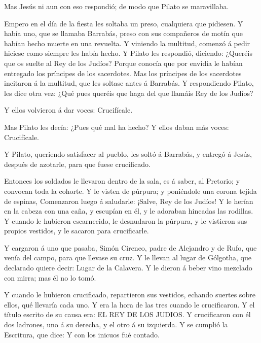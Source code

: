  Mas Jesús ni aun con eso respondió; de modo que Pilato se
maravillaba.

 Empero en el día de la fiesta les soltaba un preso,
cualquiera que pidiesen.  Y había uno, que se llamaba
Barrabás, preso con sus compañeros de motín que habían hecho muerte en
una revuelta.  Y viniendo la multitud, comenzó á pedir
hiciese como siempre les había hecho.  Y Pilato les
respondió, diciendo: ¿Queréis que os suelte al Rey de los Judíos?
 Porque conocía que por envidia le habían entregado los
príncipes de los sacerdotes.  Mas los príncipes de los
sacerdotes incitaron á la multitud, que les soltase antes á Barrabás.
 Y respondiendo Pilato, les dice otra vez: ¿Qué pues
queréis que haga del que llamáis Rey de los Judíos?

 Y ellos volvieron á dar voces: Crucifícale.

 Mas Pilato les decía: ¿Pues qué mal ha hecho? Y ellos
daban más voces: Crucifícale.

 Y Pilato, queriendo satisfacer al pueblo, les soltó á
Barrabás, y entregó á Jesús, después de azotarle, para que fuese
crucificado.

 Entonces los soldados le llevaron dentro de la sala, es á
saber, al Pretorio; y convocan toda la cohorte.  Y le
visten de púrpura; y poniéndole una corona tejida de espinas,
 Comenzaron luego á saludarle: ¡Salve, Rey de los Judíos!
 Y le herían en la cabeza con una caña, y escupían en él, y
le adoraban hincadas las rodillas.  Y cuando le hubieron
escarnecido, le desnudaron la púrpura, y le vistieron sus propios
vestidos, y le sacaron para crucificarle.

 Y cargaron á uno que pasaba, Simón Cireneo, padre de
Alejandro y de Rufo, que venía del campo, para que llevase su cruz.
 Y le llevan al lugar de Gólgotha, que declarado quiere
decir: Lugar de la Calavera.  Y le dieron á beber vino
mezclado con mirra; mas él no lo tomó.

 Y cuando le hubieron crucificado, repartieron sus
vestidos, echando suertes sobre ellos, qué llevaría cada uno.
 Y era la hora de las tres cuando le crucificaron.
 Y el título escrito de su causa era: EL REY DE LOS JUDIOS.
 Y crucificaron con él dos ladrones, uno á su derecha, y el
otro á su izquierda.  Y se cumplió la Escritura, que dice:
Y con los inicuos fué contado.

